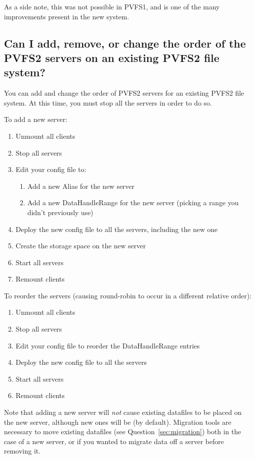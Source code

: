 \documentclass[11pt,letterpaper]{article}
\begin{document}
As a side note, this was not possible in PVFS1, and is one of the many
improvements present in the new system.

\subsection{Can I add, remove, or change the order of the PVFS2 servers
            on an existing PVFS2 file system?}

You can add and change the order of PVFS2 servers for an existing PVFS2 file
system.  At this time, you must stop all the servers in order to do so.

To add a new server:
\begin{enumerate}
\item Unmount all clients
\item Stop all servers
\item Edit your config file to:
  \begin{enumerate}
  \item Add a new Alias for the new server
  \item Add a new DataHandleRange for the new server (picking a range you
        didn't previously use)
  \end{enumerate}
\item Deploy the new config file to all the servers, including the new one
\item Create the storage space on the new server
\item Start all servers
\item Remount clients
\end{enumerate}

To reorder the servers (causing round-robin to occur in a different relative
order):
\begin{enumerate}
\item Unmount all clients
\item Stop all servers
\item Edit your config file to reorder the DataHandleRange entries
\item Deploy the new config file to all the servers
\item Start all servers
\item Remount clients
\end{enumerate}

Note that adding a new server will \emph{not} cause existing datafiles to be
placed on the new server, although new ones will be (by default).  Migration
tools are necessary to move existing datafiles (see
Question~\ref{sec:migration}) both in the case of a new server, or if you
wanted to migrate data off a server before removing it.
\end{document}

